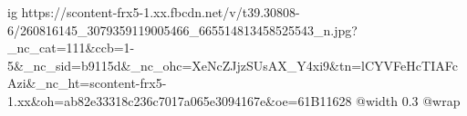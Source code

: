  
 
 
 
 

\ifcmt
  ig https://scontent-frx5-1.xx.fbcdn.net/v/t39.30808-6/260816145_3079359119005466_665514813458525543_n.jpg?_nc_cat=111&ccb=1-5&_nc_sid=b9115d&_nc_ohc=XeNcZJjzSUsAX_Y4xi9&tn=lCYVFeHcTIAFcAzi&_nc_ht=scontent-frx5-1.xx&oh=ab82e33318c236c7017a065e3094167e&oe=61B11628
  @width 0.3
  @wrap 
\fi

